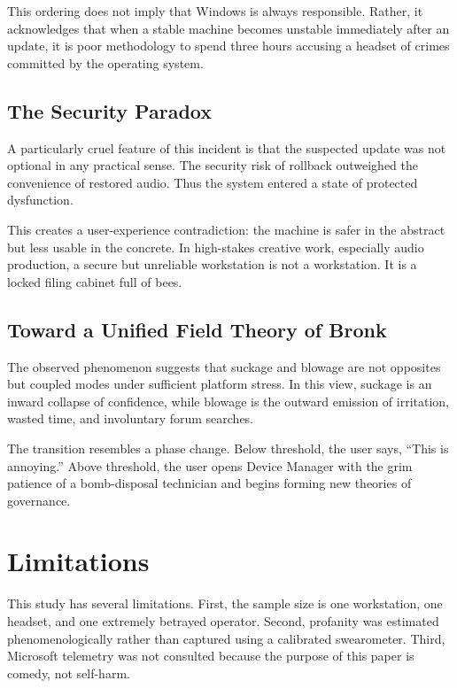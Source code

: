 \documentclass[10pt,twocolumn]{article}
\begin{document}
This ordering does not imply that Windows is always responsible. Rather, it acknowledges that when a stable machine becomes unstable immediately after an update, it is poor methodology to spend three hours accusing a headset of crimes committed by the operating system.

\subsection{The Security Paradox}

A particularly cruel feature of this incident is that the suspected update was not optional in any practical sense. The security risk of rollback outweighed the convenience of restored audio. Thus the system entered a state of protected dysfunction.

This creates a user-experience contradiction: the machine is safer in the abstract but less usable in the concrete. In high-stakes creative work, especially audio production, a secure but unreliable workstation is not a workstation. It is a locked filing cabinet full of bees.

\subsection{Toward a Unified Field Theory of Bronk}

The observed phenomenon suggests that suckage and blowage are not opposites but coupled modes under sufficient platform stress. In this view, suckage is an inward collapse of confidence, while blowage is the outward emission of irritation, wasted time, and involuntary forum searches.

The transition resembles a phase change. Below threshold, the user says, ``This is annoying.'' Above threshold, the user opens Device Manager with the grim patience of a bomb-disposal technician and begins forming new theories of governance.

\section{Limitations}

This study has several limitations. First, the sample size is one workstation, one headset, and one extremely betrayed operator. Second, profanity was estimated phenomenologically rather than captured using a calibrated swearometer. Third, Microsoft telemetry was not consulted because the purpose of this paper is comedy, not self-harm.
\end{document}
